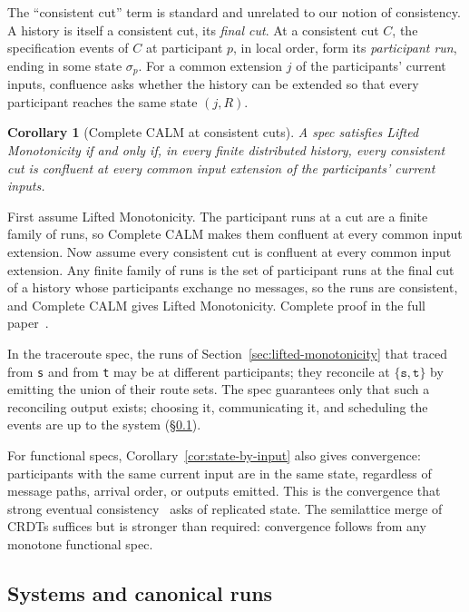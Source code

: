\documentclass[sigconf]{cidr-2027}
\makeatletter
\newtheorem{corollary}{Corollary}
\theoremstyle{remark}
\newcommand{\indesc}{input extension\xspace} %
\newcommand{\fullproof}{Complete proof in the full paper~\cite{hellerstein2026completecalmfull}.}
\renewenvironment{proof}[1][\proofname]{\par
  \pushQED{\qed}\normalfont\topsep2\p@\relax
  \trivlist\item[\@proofindent\hskip\labelsep{\@proofnamefont #1\@addpunct{.}}]\ignorespaces
}{\popQED\endtrivlist\@endpefalse}
\makeatother
\begin{document}
The ``consistent cut'' term is standard and unrelated to our notion of consistency.  A history
is itself a consistent cut, its \emph{final cut}.  At a
consistent cut $C$, the specification events of $C$ at participant $p$,
in local order, form its \emph{participant run}, ending in some state
$\sigma_p$.  For a common extension $j$ of the participants' current inputs,
confluence asks whether the history can be extended so that every participant
reaches the same state $(j,R)$.

\begin{corollary}[Complete CALM at consistent cuts]
\label{cor:distributed-calm}
A spec satisfies Lifted Monotonicity if and only if, in every finite
distributed history, every consistent cut is confluent at every common
\indesc of the participants' current inputs.
\end{corollary}

\begin{proof}[Proof sketch]
First assume Lifted Monotonicity.  The participant runs at a cut are a finite
family of runs, so Complete CALM makes them confluent at every common
\indesc.  Now assume every consistent cut is confluent at every common \indesc.  Any finite family of runs is the set of
participant runs at the final cut of a history whose participants exchange no
messages, so the runs are consistent, and Complete CALM gives Lifted
Monotonicity.  \fullproof
\end{proof}

In the traceroute spec, the runs of Section~\ref{sec:lifted-monotonicity} that traced from \texttt{s} and from \texttt{t} may be at different participants; they reconcile at $\{\texttt{s},\texttt{t}\}$ by emitting the union of their route sets.  The spec guarantees only that such
a reconciling output exists; choosing it, communicating it, and scheduling the events are up
to the system (\S\ref{sec:systems}).

For functional specs,
Corollary~\ref{cor:state-by-input} also gives convergence: participants with
the same current input are in the same state, regardless of message paths,
arrival order, or outputs emitted.  This is the convergence that strong eventual consistency~\cite{shapiro2011crdt}
asks of replicated state.  The semilattice merge of CRDTs suffices but
is stronger than required: convergence follows from any monotone functional
spec.

\subsection{Systems and canonical runs}
\label{sec:systems}
\end{document}
